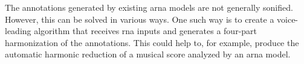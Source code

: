 
The annotations generated by existing \gls{arna} models are
not generally sonified. However, this can be solved in
various ways. One such way is to create a voice-leading
algorithm that receives \gls{rna} inputs and generates a
four-part harmonization of the annotations. This could help
to, for example, produce the automatic harmonic reduction of
a musical score analyzed by an \gls{arna} model.
